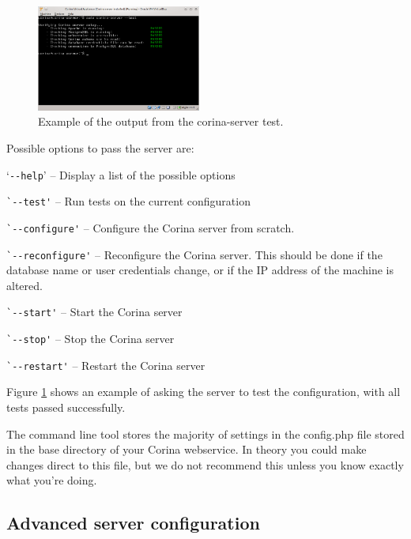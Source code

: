 
\begin{figure}
  \begin{center}
    \includegraphics[width=0.48\textwidth]{Images/corina-server-terminal.png}
  \end{center}
  \caption{Example of the output from the corina-server test.}
  \label{fig:serverTerminal}
\end{figure}

Possible options to pass the server are:

\begin{itemize*}
 \item `\verb|--help|' -- Display a list of the possible options
 \item \verb|`--test'| -- Run tests on the current configuration
 \item \verb|`--configure'| -- Configure the Corina server from scratch.  
 \item \verb|`--reconfigure'| -- Reconfigure the Corina server.  This should be done if the database name or user credentials change, or if the IP address of the machine is altered.
 \item \verb|`--start'| -- Start the Corina server
 \item \verb|`--stop'| -- Stop the Corina server
 \item \verb|`--restart'| -- Restart the Corina server
\end{itemize*} 

Figure \ref{fig:serverTerminal} shows an example of asking the server to test the configuration, with all tests passed successfully.

The command line tool stores the majority of settings in the config.php file stored in the base directory of your Corina webservice.  In theory you could make changes direct to this file, but we do not recommend this unless you know exactly what you're doing.


\subsection{Advanced server configuration}


